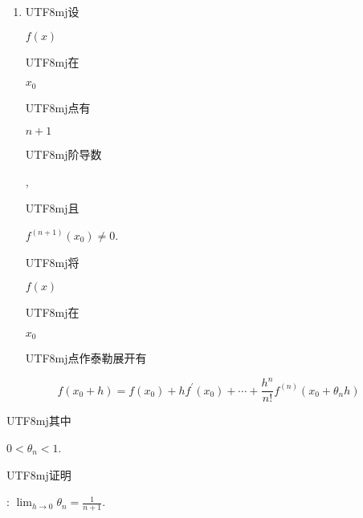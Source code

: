 \documentclass[10pt]{article}
\begin{document}
\begin{enumerate}
  \item \begin{CJK}{UTF8}{mj}设\end{CJK} $f(x)$ \begin{CJK}{UTF8}{mj}在\end{CJK} $x_{0}$ \begin{CJK}{UTF8}{mj}点有\end{CJK} $n+1$ \begin{CJK}{UTF8}{mj}阶导数\end{CJK}, \begin{CJK}{UTF8}{mj}且\end{CJK} $f^{(n+1)}\left(x_{0}\right) \neq 0$. \begin{CJK}{UTF8}{mj}将\end{CJK} $f(x)$ \begin{CJK}{UTF8}{mj}在\end{CJK} $x_{0}$ \begin{CJK}{UTF8}{mj}点作泰勒展开有\end{CJK}

\end{enumerate}
$$
f\left(x_{0}+h\right)=f\left(x_{0}\right)+h f^{\prime}\left(x_{0}\right)+\cdots+\frac{h^{n}}{n !} f^{(n)}\left(x_{0}+\theta_{n} h\right)
$$
\begin{CJK}{UTF8}{mj}其中\end{CJK} $0<\theta_{n}<1$. \begin{CJK}{UTF8}{mj}证明\end{CJK}: $\lim _{h \rightarrow 0} \theta_{n}=\frac{1}{n+1}$.
\end{document}
